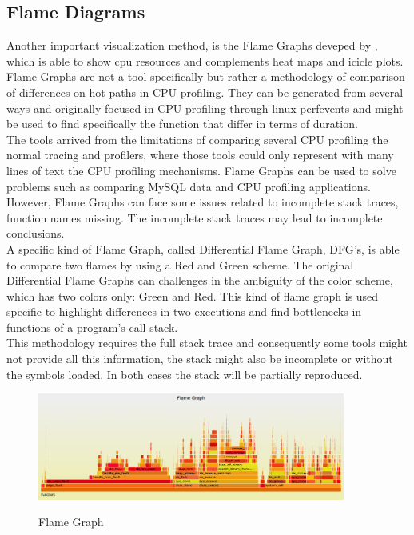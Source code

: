 \subsection{Flame Diagrams}
Another important visualization method, is the Flame Graphs deveped by \cite{brendan_flamegraph}, which is able to show cpu resources and complements heat maps and icicle plots. Flame Graphs are not a tool specifically but rather a methodology of comparison of differences on hot paths in CPU profiling. They can be generated from several ways and originally focused in CPU profiling through linux perf\textunderscore events and might be used to find specifically the function that differ in terms of duration.\\
The tools arrived from the limitations of comparing several CPU profiling the normal tracing and profilers, where those tools could only represent with many lines of text the CPU profiling mechanisms.
Flame Graphs can be used to solve problems such as comparing MySQL data and CPU profiling applications. However, Flame Graphs can face some issues related to incomplete stack traces, function names missing. The incomplete stack traces may lead to incomplete conclusions.\\
A specific kind of Flame Graph, called Differential Flame Graph, DFG’s, is able to compare two flames by using a Red and Green scheme. The original Differential Flame Graphs can challenges in the ambiguity of the color scheme, which has two colors only: Green and Red. This kind of flame graph is used specific to highlight differences in two executions and find bottlenecks in functions of a program's call stack. \\
This methodology requires the full stack trace and consequently some tools might not provide all this information, the stack might also be incomplete or without the symbols loaded. In both cases the stack will be partially reproduced.
 
 \begin{figure}[h]
          \center
          \caption{Flame Graph}
            \includegraphics[width=0.90\textwidth]{figures/cpu-linux-execs.png}
            \label{fig:FlameGraph}
    \end{figure}
 
